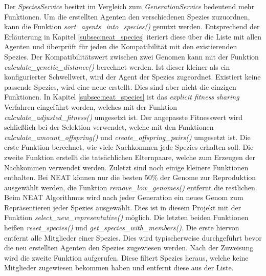 Der \emph{SpeciesService} besitzt im Vergleich zum \emph{GenerationService} bedeutend mehr Funktionen. Um die erstellten Agenten den verschiedenen Spezies zuzuordnen, kann die Funktion \emph{ sort\_agents\_into\_species()} genutzt werden. Entsprechend der Erläuterung in Kapitel \ref{subsec:neat_species} iteriert diese über die Liste mit allen Agenten und überprüft für jeden die Kompatibilität mit den existierenden Spezies. Der Kompatibilitätswert zwischen zwei Genomen kann mit der Funktion \emph{calculate\_genetic\_distance()} berechnet werden. Ist dieser kleiner als ein konfigurierter Schwellwert, wird der Agent der Spezies zugeordnet. Existiert keine passende Spezies, wird eine neue erstellt. Dies sind aber nicht die einzigen Funktionen. In Kapitel \ref{subsec:neat_species} ist das \emph{explicit fitness sharing} Verfahren eingeführt worden, welches mit der Funktion \emph{calculate\_adjusted\_fitness()} umgesetzt ist. Der angepasste Fitnesswert wird schließlich bei der Selektion verwendet, welche mit den Funktionen \emph{calculate\_amount\_offspring()} und \emph{create\_offspring\_pairs()} umgesetzt ist. Die erste Funktion berechnet, wie viele Nachkommen jede Spezies erhalten soll. Die zweite Funktion erstellt die tatsächlichen Elternpaare, welche zum Erzeugen der Nachkommen verwendet werden. Zuletzt sind noch einige kleinere Funktionen enthalten. Bei \ac{NEAT} können nur die besten $50\%$ der Genome zur Reproduktion ausgewählt werden, die Funktion \emph{remove\_low\_genomes()} entfernt die restlichen. Beim \ac{NEAT} Algorithmus wird nach jeder Generation ein neues Genom zum Repräsentieren jeder Spezies ausgewählt.  Dies ist in diesem Projekt mit der Funktion \emph{select\_new\_representative()} möglich. Die letzten beiden Funktionen heißen \emph{reset\_species()} und \emph{get\_species\_with\_members()}. Die erste hiervon entfernt alle Mitglieder einer Spezies. Dies wird typischerweise durchgeführt bevor die neu erstellten Agenten den Spezies zugewiesen werden. Nach der Zuweisung wird die zweite Funktion aufgerufen. Diese filtert Spezies heraus, welche keine Mitglieder zugewiesen bekommen haben und entfernt diese aus der Liste. 

